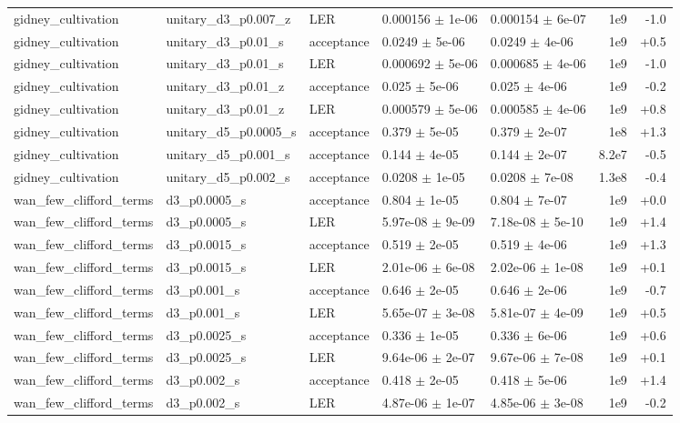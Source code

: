 \documentclass[10pt]{article}
\begin{document}
{\begin{longtable}{l l l l l r r}
gidney\_cultivation & unitary\_d3\_p0.007\_z & LER & 0.000156 $\pm$ 1e-06 & 0.000154 $\pm$ 6e-07 & 1e9 & -1.0 \\
gidney\_cultivation & unitary\_d3\_p0.01\_s & acceptance & 0.0249 $\pm$ 5e-06 & 0.0249 $\pm$ 4e-06 & 1e9 & +0.5 \\
gidney\_cultivation & unitary\_d3\_p0.01\_s & LER & 0.000692 $\pm$ 5e-06 & 0.000685 $\pm$ 4e-06 & 1e9 & -1.0 \\
gidney\_cultivation & unitary\_d3\_p0.01\_z & acceptance & 0.025 $\pm$ 5e-06 & 0.025 $\pm$ 4e-06 & 1e9 & -0.2 \\
gidney\_cultivation & unitary\_d3\_p0.01\_z & LER & 0.000579 $\pm$ 5e-06 & 0.000585 $\pm$ 4e-06 & 1e9 & +0.8 \\
gidney\_cultivation & unitary\_d5\_p0.0005\_s & acceptance & 0.379 $\pm$ 5e-05 & 0.379 $\pm$ 2e-07 & 1e8 & +1.3 \\
gidney\_cultivation & unitary\_d5\_p0.001\_s & acceptance & 0.144 $\pm$ 4e-05 & 0.144 $\pm$ 2e-07 & 8.2e7 & -0.5 \\
gidney\_cultivation & unitary\_d5\_p0.002\_s & acceptance & 0.0208 $\pm$ 1e-05 & 0.0208 $\pm$ 7e-08 & 1.3e8 & -0.4 \\
wan\_few\_clifford\_terms & d3\_p0.0005\_s & acceptance & 0.804 $\pm$ 1e-05 & 0.804 $\pm$ 7e-07 & 1e9 & +0.0 \\
wan\_few\_clifford\_terms & d3\_p0.0005\_s & LER & 5.97e-08 $\pm$ 9e-09 & 7.18e-08 $\pm$ 5e-10 & 1e9 & +1.4 \\
wan\_few\_clifford\_terms & d3\_p0.0015\_s & acceptance & 0.519 $\pm$ 2e-05 & 0.519 $\pm$ 4e-06 & 1e9 & +1.3 \\
wan\_few\_clifford\_terms & d3\_p0.0015\_s & LER & 2.01e-06 $\pm$ 6e-08 & 2.02e-06 $\pm$ 1e-08 & 1e9 & +0.1 \\
wan\_few\_clifford\_terms & d3\_p0.001\_s & acceptance & 0.646 $\pm$ 2e-05 & 0.646 $\pm$ 2e-06 & 1e9 & -0.7 \\
wan\_few\_clifford\_terms & d3\_p0.001\_s & LER & 5.65e-07 $\pm$ 3e-08 & 5.81e-07 $\pm$ 4e-09 & 1e9 & +0.5 \\
wan\_few\_clifford\_terms & d3\_p0.0025\_s & acceptance & 0.336 $\pm$ 1e-05 & 0.336 $\pm$ 6e-06 & 1e9 & +0.6 \\
wan\_few\_clifford\_terms & d3\_p0.0025\_s & LER & 9.64e-06 $\pm$ 2e-07 & 9.67e-06 $\pm$ 7e-08 & 1e9 & +0.1 \\
wan\_few\_clifford\_terms & d3\_p0.002\_s & acceptance & 0.418 $\pm$ 2e-05 & 0.418 $\pm$ 5e-06 & 1e9 & +1.4 \\
wan\_few\_clifford\_terms & d3\_p0.002\_s & LER & 4.87e-06 $\pm$ 1e-07 & 4.85e-06 $\pm$ 3e-08 & 1e9 & -0.2 \\

\end{longtable}}
\end{document}
